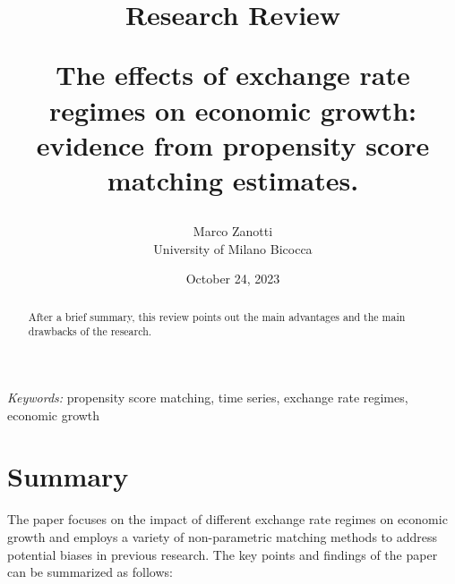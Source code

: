 \documentclass[
  12pt]{article}
\begin{document}
\def\spacingset#1{\renewcommand{\baselinestretch}%
{#1}\small\normalsize} \spacingset{1}



\date{October 24, 2023}
\title{\bf Research Review

The effects of exchange rate regimes on economic growth: evidence from
propensity score matching estimates.}
\author{
Marco Zanotti\\
University of Milano Bicocca\\
}
\maketitle

\bigskip
\bigskip
\begin{abstract}
After a brief summary, this review points out the main advantages and
the main drawbacks of the research.
\end{abstract}

\noindent%
{\it Keywords:} propensity score matching, time series, exchange rate
regimes, economic growth
\vfill

\newpage
\spacingset{1.9} %
\ifdefined\Shaded\renewenvironment{Shaded}{\begin{tcolorbox}[frame hidden, sharp corners, borderline west={3pt}{0pt}{shadecolor}, breakable, enhanced, boxrule=0pt, interior hidden]}{\end{tcolorbox}}\fi

\hypertarget{summary}{%
\section{Summary}\label{summary}}

The paper focuses on the impact of different exchange rate regimes on
economic growth and employs a variety of non-parametric matching methods
to address potential biases in previous research. The key points and
findings of the paper can be summarized as follows:
\end{document}
